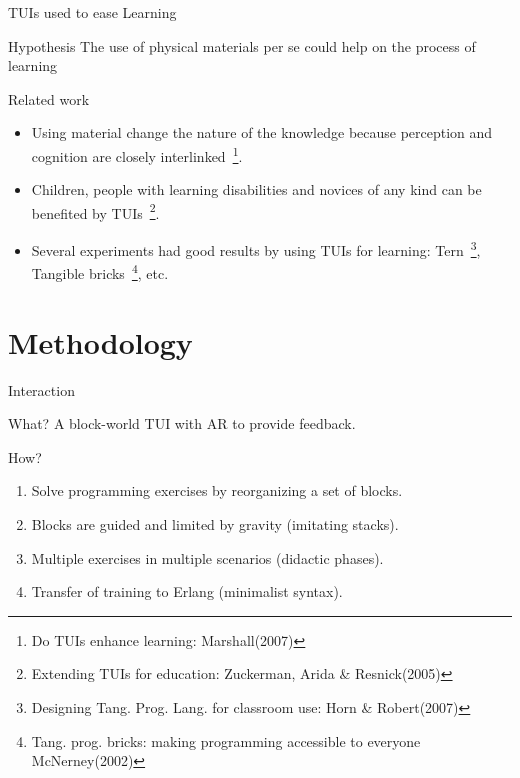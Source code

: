 \begin{frame} {TUIs used to ease Learning}
  \begin{block}{Hypothesis}
    The use of physical materials per se could help on the
    process of learning
  \end{block}
  \begin{block}{Related work}
    \begin{itemize}
    \item Using material change the nature of the knowledge
      because perception and cognition are closely interlinked~\footnote{Do
        TUIs enhance learning: Marshall(2007)}.
    \item Children, people with learning disabilities and novices of any kind can
      be benefited by TUIs~\footnote{Extending TUIs for education: Zuckerman, Arida \& Resnick(2005)}.
    \item Several experiments had good results by using TUIs for learning:
      Tern~\footnote{Designing Tang. Prog. Lang. for classroom use: Horn \& Robert(2007)},
      Tangible bricks~\footnote{Tang. prog. bricks: making programming accessible to everyone McNerney(2002)}, etc.
    \end{itemize}
  \end{block}
\end{frame}

\section{Methodology}



\begin{frame}{Interaction}
  \begin{block} {What?}
    A block-world TUI with AR to provide feedback.
  \end{block}
  \begin{block} {How?}
    \begin{enumerate}
    \item Solve programming exercises by reorganizing a set of blocks.
    \item Blocks are guided and limited by gravity (imitating stacks).
    \item Multiple exercises in multiple scenarios (didactic phases).
    \item Transfer of training to Erlang (minimalist syntax).
    \end{enumerate}
  \end{block}
\end{frame}


